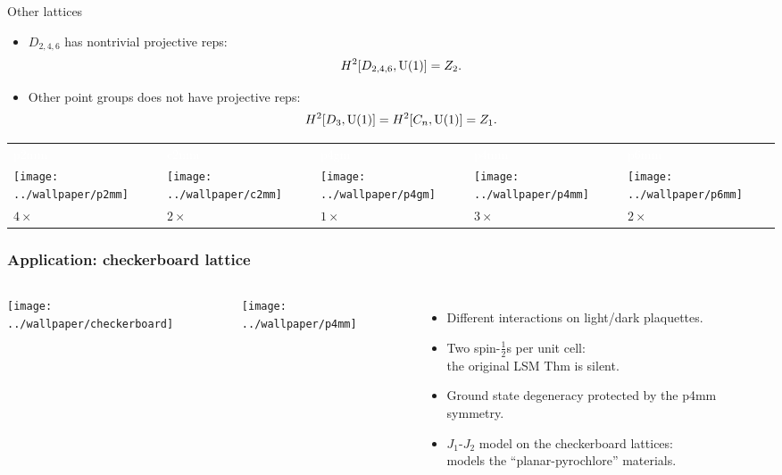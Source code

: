 \documentclass[xcolor=table, 10pt, aspectratio=169]{beamer}
\renewcommand{\arraystretch}{1.5}
\begin{document}
\begin{frame}{Other lattices}
  \begin{itemize}
    \item $D_{2,4,6}$ has nontrivial projective reps:
    \[H^2[D_{2,4,6}, \text U(1)] = Z_2.\]
    \item Other point groups does not have projective reps:
    \[H^2[D_3, \text U(1)] = H^2[C_n, \text U(1)] = Z_1.\]
  \end{itemize}
  \begin{table}
    \centering
    \renewcommand{\arraystretch}{1.5}
    \begin{tabularx}{\columnwidth}{xxxxx}
      \textcolor{white}{p2mm}
      &\textcolor{white}{c2mm}
      &\textcolor{white}{p4gm}
      &\textcolor{white}{p4mm}
      &\textcolor{white}{p6mm}\\
      \texttt{[image: ../wallpaper/p2mm]} &
      \texttt{[image: ../wallpaper/c2mm]} &
      \texttt{[image: ../wallpaper/p4gm]} &
      \texttt{[image: ../wallpaper/p4mm]} &
      \texttt{[image: ../wallpaper/p6mm]}\\
      $4\times$ & $2\times$ & $1\times$ & $3\times$ & $2\times$
    \end{tabularx}
  \end{table}
\end{frame}

\begin{frame}
  \frametitle{Application: checkerboard lattice}
  \begin{columns}
    \begin{center}
      \texttt{[image: ../wallpaper/checkerboard]}\\
    \end{center}
    \begin{center}
      \texttt{[image: ../wallpaper/p4mm]}
    \end{center}
    \begin{itemize}
    \item Different interactions on light/dark plaquettes.
    \item Two spin-$\frac12$s per unit cell:\\the original LSM Thm is silent.
    \item Ground state degeneracy protected by the p4mm symmetry.
    \item $J_1$-$J_2$ model on the checkerboard lattices:\\
    models the ``planar-pyrochlore'' materials.
    \end{itemize}
  \end{columns}
\end{frame}
\end{document}
